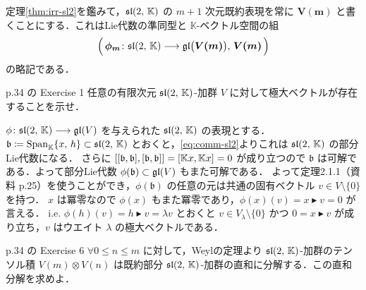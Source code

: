 \documentclass{ltjsarticle}
\makeatletter
\theoremstyle{mystyle} %
\renewcommand{\proofname}{証明}
\renewenvironment{proof}[1][\proofname]{\par
    \pushQED{\qed}%
    \normalfont \topsep6\p@\@plus6\p@\relax
    \trivlist
    \item[\hskip\labelsep
        \itshape
    \textbf{\underline{#1}}]\ignorespaces
}{%
    \popQED\endtrivlist\@endpefalse
}
\numberwithin{equation}{section}
\newcommand{\lto}{\longrightarrow}
\newcommand{\btr}{\blacktriangleright}
\makeatother
\begin{document}
定理\ref{thm:irr-sl2}を鑑みて，$\mathfrak{sl}(2,\, \mathbb{K})$ の $m+1$ 次元既約表現を常に $\bm{V(m)}$ と書くことにする．これはLie代数の準同型と $\mathbb{K}$-ベクトル空間の組
\begin{align}
    \Bigl(\, \bm{\phi_m} \colon \Lsl(2,\, \mathbb{K}) \lto \Lgl \bigl( \bm{V(m)} \bigr),\, \bm{V(m)}\, \Bigr)
\end{align}
の略記である．

\begin{myproblem}[label=ex:2-7-1]{p.34 の Exercise 1}
    任意の有限次元 $\mathfrak{sl}(2,\, \mathbb{K})$-加群 $V$ に対して極大ベクトルが存在することを示せ．
\end{myproblem}

\begin{proof}
    $\phi \colon \Lsl(2,\, \mathbb{K}) \lto \Lgl(V)$ を与えられた $\mathfrak{sl}(2,\, \mathbb{K})$ の表現とする．
    $\mathfrak{b} \coloneqq \operatorname{Span}_{\mathbb{K}}\{x,\, h\}\subset \mathfrak{sl}(2,\, \mathbb{K})$ とおくと，\eqref{eq:comm-sl2}よりこれは $\mathfrak{sl}(2,\, \mathbb{K})$ の部分Lie代数になる．
    さらに $\comm{\comm{\mathfrak{b}}{\mathfrak{b}}}{\comm{\mathfrak{b}}{\mathfrak{b}}} = \comm{\mathbb{K}x}{\mathbb{K}x} = 0$ が成り立つので $\mathfrak{b}$ は可解である．よって部分Lie代数 $\phi(\mathfrak{b}) \subset \mathfrak{gl}(V)$ もまた可解である．
    よって定理2.1.1（資料 p.25）を使うことができ，$\phi(\mathfrak{b})$ の任意の元は共通の固有ベクトル $v \in V\setminus \{0\}$ を持つ．
    $x$ は冪零なので $\phi(x)$ もまた冪零であり，$\phi(x)(v) = x \btr v = 0$ が言える．
    i.e. $\phi(h)(v) = h \btr v = \lambda v$ とおくと $v \in V_\lambda \setminus \{0\}$ かつ $0 = x \btr v$ が成り立ち，$v$ はウエイト $\lambda$ の極大ベクトルである．
\end{proof}


\begin{myproblem}[label=ex:2-7-6]{p.34 の Exercise 6}
    $\forall 0 \le n \le m$ に対して，Weylの定理より
    $\mathfrak{sl}(2,\, \mathbb{K})$-加群のテンソル積 $V(m) \otimes V(n)$ は既約部分 $\mathfrak{sl}(2,\, \mathbb{K})$-加群の直和に分解する．この直和分解を求めよ．
\end{myproblem}
\end{document}

